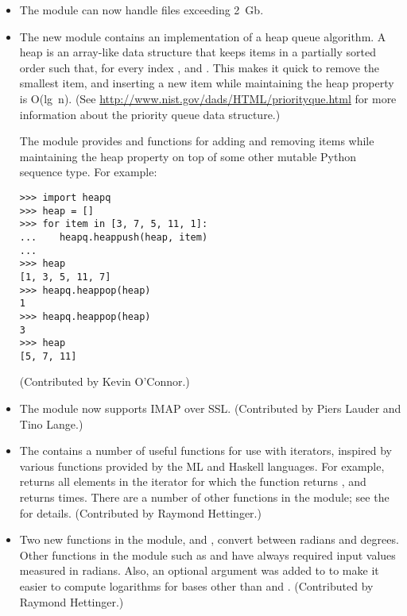 \documentclass{howto}
\begin{document}
\begin{itemize}
\item The  module can now handle files exceeding 2~Gb.  

\item The new  module contains an implementation of a
heap queue algorithm.  A heap is an array-like data structure that
keeps items in a partially sorted order such that, for every index
,  and
.  This makes it quick to
remove the smallest item, and inserting a new item while maintaining
the heap property is O(lg~n).  (See
\url{http://www.nist.gov/dads/HTML/priorityque.html} for more
information about the priority queue data structure.)

The  module provides  and
 functions for adding and removing items while
maintaining the heap property on top of some other mutable Python
sequence type.  For example:

\begin{verbatim}
>>> import heapq
>>> heap = []
>>> for item in [3, 7, 5, 11, 1]:
...    heapq.heappush(heap, item)
...
>>> heap
[1, 3, 5, 11, 7]
>>> heapq.heappop(heap)
1
>>> heapq.heappop(heap)
3
>>> heap
[5, 7, 11]
\end{verbatim}

(Contributed by Kevin O'Connor.)

\item The  module now supports IMAP over SSL.
(Contributed by Piers Lauder and Tino Lange.)

\item The  contains a number of useful functions for
use with iterators, inspired by various functions provided by the ML
and Haskell languages.  For example,
 returns all elements in
the iterator for which the function  returns
, and  returns
  times.  There are a number of other functions in
the module; see the  for details.
(Contributed by Raymond Hettinger.)

\item Two new functions in the  module,
 and ,
convert between radians and degrees.  Other functions in the
 module such as  and
 have always required input values measured in
radians.  Also, an optional  argument was added to
 to make it easier to compute logarithms for
bases other than  and .  (Contributed by Raymond
Hettinger.)


\end{itemize}
\end{document}

